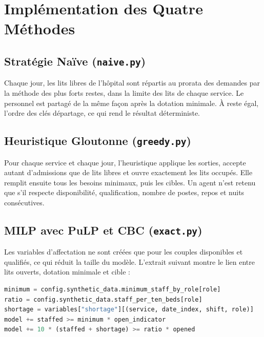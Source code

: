 \section{Implémentation des Quatre Méthodes}

\subsection{Stratégie Naïve (\texttt{naive.py})}
Chaque jour, les lits libres de l'hôpital sont répartis au prorata des demandes par la méthode des plus forts restes, dans la limite des lits de chaque service. Le personnel est partagé de la même façon après la dotation minimale. À reste égal, l'ordre des clés départage, ce qui rend le résultat déterministe.

\subsection{Heuristique Gloutonne (\texttt{greedy.py})}
Pour chaque service et chaque jour, l'heuristique applique les sorties, accepte autant d'admissions que de lits libres et ouvre exactement les lits occupés. Elle remplit ensuite tous les besoins minimaux, puis les cibles. Un agent n'est retenu que s'il respecte disponibilité, qualification, nombre de postes, repos et nuits consécutives.

\subsection{MILP avec PuLP et CBC (\texttt{exact.py})}
Les variables d'affectation ne sont créées que pour les couples disponibles et qualifiés, ce qui réduit la taille du modèle. L'extrait suivant montre le lien entre lits ouverts, dotation minimale et cible :

\begin{lstlisting}[language=Python, caption={Dotation minimale et cible de personnel (extrait de \texttt{exact.py}).}]
minimum = config.synthetic_data.minimum_staff_by_role[role]
ratio = config.synthetic_data.staff_per_ten_beds[role]
shortage = variables["shortage"][(service, date_index, shift, role)]
model += staffed >= minimum * open_indicator
model += 10 * (staffed + shortage) >= ratio * opened
\end{lstlisting}

